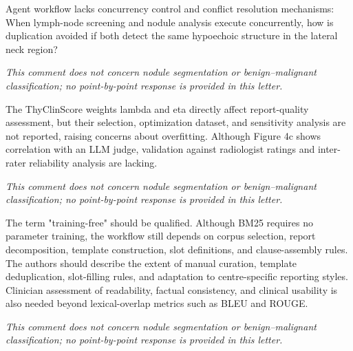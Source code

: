 \begin{reviewercomment}
Agent workflow lacks concurrency control and conflict resolution mechanisms: When lymph-node screening and nodule analysis execute concurrently, how is duplication avoided if both detect the same hypoechoic structure in the lateral neck region?
\end{reviewercomment}
\begin{authorresponse}
\noindent\textit{This comment does not concern nodule segmentation or benign--malignant classification; no point-by-point response is provided in this letter.}
\end{authorresponse}

\begin{reviewercomment}
The ThyClinScore weights lambda and eta directly affect report-quality assessment, but their selection, optimization dataset, and sensitivity analysis are not reported, raising concerns about overfitting. Although Figure 4c shows correlation with an LLM judge, validation against radiologist ratings and inter-rater reliability analysis are lacking.
\end{reviewercomment}
\begin{authorresponse}
\noindent\textit{This comment does not concern nodule segmentation or benign--malignant classification; no point-by-point response is provided in this letter.}
\end{authorresponse}

\begin{reviewercomment}
The term "training-free" should be qualified. Although BM25 requires no parameter training, the workflow still depends on corpus selection, report decomposition, template construction, slot definitions, and clause-assembly rules. The authors should describe the extent of manual curation, template deduplication, slot-filling rules, and adaptation to centre-specific reporting styles. Clinician assessment of readability, factual consistency, and clinical usability is also needed beyond lexical-overlap metrics such as BLEU and ROUGE.
\end{reviewercomment}
\begin{authorresponse}
\noindent\textit{This comment does not concern nodule segmentation or benign--malignant classification; no point-by-point response is provided in this letter.}
\end{authorresponse}

